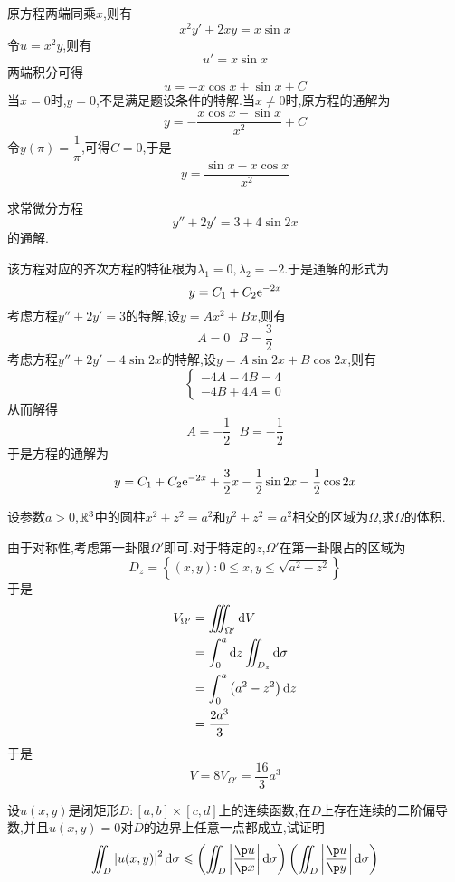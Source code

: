 \documentclass{ctexart}
\begin{document}
\begin{solution}
    原方程两端同乘$x$,则有
    \[x^2y'+2xy=x\sin x\]
    令$u=x^2y$,则有
    \[u'=x\sin x\]
    两端积分可得
    \[u=-x\cos x+\sin x+C\]
    当$x=0$时,$y=0$,不是满足题设条件的特解.当$x\neq0$时,原方程的通解为
    \[y=-\dfrac{x\cos x-\sin x}{x^2}+C\]
    令$y(\pi)=\dfrac1\pi$,可得$C=0$,于是
    \[y=\dfrac{\sin x-x\cos x}{x^2}\]
\end{solution}
\begin{problem}[6.(10\songti{分})]
    求常微分方程
    \[y''+2y'=3+4\sin 2x\]
    的通解.
\end{problem}
\begin{solution}
    该方程对应的齐次方程的特征根为$\lambda_1=0,\lambda_2=-2$.于是通解的形式为
    \[y=C_1+C_2\mathrm{e}^{-2x}\]
    考虑方程$y''+2y'=3$的特解,设$y=Ax^2+Bx$,则有
    \[A=0\ \ \ B=\dfrac32\]
    考虑方程$y''+2y'=4\sin2x$的特解,设$y=A\sin2x+B\cos2x$,则有
    \[\left\{\begin{array}{l}
        -4A-4B=4\\
        -4B+4A=0
    \end{array}\right.\]
    从而解得
    \[A=-\dfrac12\ \ \ B=-\dfrac12\]
    于是方程的通解为
    \[y=C_1+C_2\mathrm{e}^{-2x}+\dfrac32x-\dfrac12\sin2x-\dfrac12\cos2x\]

\end{solution}
\begin{problem}[7.(10\songti{分})]
    设参数$a>0$,$\mathbb{R}^3$中的圆柱$x^2+z^2=a^2$和$y^2+z^2=a^2$相交的区域为$\Omega$,求$\Omega$的体积.
\end{problem}
\begin{solution}
    由于对称性,考虑第一卦限$\Omega'$即可.对于特定的$z$,$\Omega'$在第一卦限占的区域为
    \[D_z=\left\{(x,y):0\leqslant x,y\leqslant\sqrt{a^2-z^2}\right\}\]
    于是
    \[\begin{aligned}
        V_{\Omega'}
        &= \iiint_{\Omega'}\mathrm{d} V \\
        &= \int_0^a\mathrm{d} z\iint_{D_z}\mathrm{d}\sigma \\
        &= \int_0^a\left(a^2-z^2\right)\mathrm{d} z \\
        &= \dfrac{2a^3}{3}
    \end{aligned}\]
    于是
    \[V=8V_{\Omega'}=\dfrac{16}{3}a^3\]

\end{solution}
\begin{problem}[8.(10\songti{分})]
    设$u(x,y)$是闭矩形$D:[a,b]\times[c,d]$上的连续函数,在$D$上存在连续的二阶偏导数,并且$u(x,y)=0$对$D$的边界上任意一点都成立,试证明
    \[\iint_D\left|u(x,y)\right|^2\di\sigma\leqslant\left(\iint_D\left|\dfrac{\p u}{\p x}\right|\di\sigma\right)\left(\iint_D\left|\dfrac{\p u}{\p y}\right|\di\sigma\right)\]

\end{problem}
\end{document}
